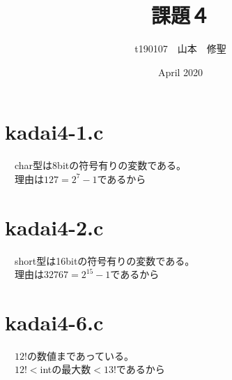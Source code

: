 \documentclass{article}
\title{課題４}
\author{t190107　山本　修聖 }
\date{April 2020}
\begin{document}
\maketitle
\section{kadai4-1.c}
　char型は8bitの符号有りの変数である。\\
　理由は$127=2^7-1$であるから
\section{kadai4-2.c}
　short型は16bitの符号有りの変数である。\\
　理由は$32767=2^15-1$であるから
\section{kadai4-6.c}
　$12!$の数値まであっている。\\
　$12!<$intの最大数$<13!$であるから
\end{document}

